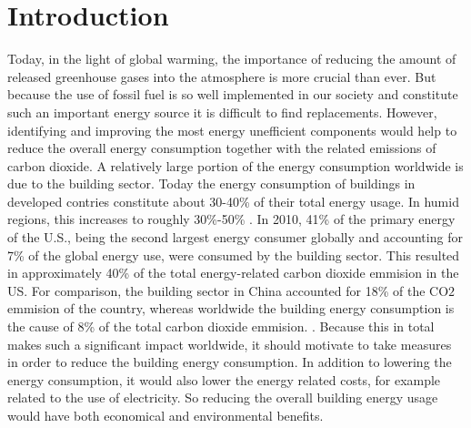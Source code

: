 \section{\textbf{Introduction}}
Today, in the light of global warming, the importance of reducing the amount of released
greenhouse gases into the atmosphere is more crucial than ever. But because the use of
fossil fuel is so well implemented in our society and constitute such an important energy source
it is difficult to find replacements. 
However, identifying and improving the most energy unefficient components 
would help to reduce the overall energy consumption together with the 
related emissions of carbon dioxide.
%
A relatively large portion of the energy consumption worldwide is due to
the building sector. 
Today the energy consumption of buildings in developed contries constitute about 30-40\%
of their total energy usage. In humid regions, this increases to roughly 30\%-50\% 
\cite{AlRabghi2001, Wilde2004, Kwak2010}. 
In 2010, 41\% of the primary energy of the U.S., being the second largest energy consumer 
globally and accounting for 7\% of the global energy use, were consumed by the building sector.
This resulted in approximately 40\% of the total energy-related carbon dioxide emmision in the US. 
For comparison, the building sector in China accounted for 18\% of the CO$2$ emmision of the country, 
whereas worldwide the building energy consumption is the cause of 8\% of the total carbon dioxide emmision.
\cite{buildingsEnergyDatabook, Hong2009}.
Because this in total makes such a significant impact worldwide, it should motivate to take
measures in order to reduce the building energy consumption.
In addition to lowering the energy consumption, it would also lower the 
energy related costs, for example related to the use of electricity. So reducing the 
overall building energy usage would have both economical and environmental benefits. 
\\
